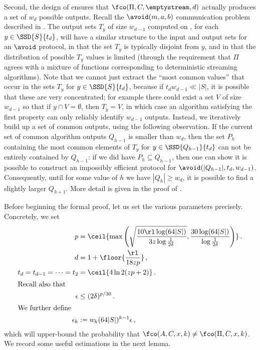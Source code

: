\begin{itemize}
\begin{itemize}
Second, the design of  ensures that
$\fco(\Pi,C,\emptystream,d)$
actually produces a set of $w_d$ possible outputs. Recall the $\avoid(m,a,b)$
communication problem described in . The output
sets $T_y$ of size $w_{d-1}$ computed on , for
each $y \in \SSD{S}{t_d}$, will have a similar structure to the input
and output sets for an $\avoid$ protocol, in that the set $T_y$ is typically
disjoint from $y$, and in that the distribution of possible $T_y$ values is
limited (through the requirement that $\Pi$ agrees with a mixture of functions
corresponding to deterministic streaming algorithms). Note that we
cannot just extract the ``most common values'' that occur in the sets $T_y$
for $y \in \SSD{S}{t_d}$, because if $t_d w_{d-1} \ll |S|$, it is
possible that these are very concentrated; for example there could exist a set
$V$ of size $w_{d-1}$ so that if $y \cap V = \emptyset$, then $T_y = V$, in
which case an algorithm satisfying the first property can only reliably
identify $w_{d-1}$ outputs. Instead, we iteratively build up a set of common
outputs, using the following observation. If the current set of common
algorithm outputs $Q_{h-1}$ is smaller than $w_d$, then the set $P_h$
containing the most common elements of $T_y$ for $y \in
\SSD{Q_{h-1}}{t_d}$ can not be entirely contained by $Q_{h-1}$: if we
did have $P_h \subseteq Q_{h-1}$, then one can show it is possible to
construct an impossibly efficient protocol for
$\avoid(|Q_{h-1}|,t_d,w_{d-1})$. Consequently, until for some value of $h$ we
have $|Q_{h}| \ge w_d$, it is possible to find a slightly larger $Q_{h+1}$.
More detail is given in the proof of .

\medskip Before beginning the formal proof, let us set the various parameters
precisely. Concretely, we set
\begin{align}
  p &= \ceil{\max\left(\sqrt{\frac{10 \rl \log (64|S|)}{3 z \log \frac{1}{2\delta}}}, 
    \frac{30 \log(64|S|)}{\log \frac{1}{2\delta}}\right) } \,.  \label{eq:pd-p-choice} \\
  d &= 1 + \floor{\frac{\rl}{18 zp}} \,, \label{eq:d-def} \\
  t_d = t_{d-1} = \cdots = t_2 &= \ceil{4 \ln 2 (zp+2)} \,. \\
\intertext{Recall also that}
  \epsilon &\le (2\delta)^{p/30} \,. \\
\intertext{We further define}
  \epsilon_k &:= w_k (64 |S|)^{k-1} \epsilon \,, \label{eq:eps-k-def}
\end{align}
which will upper-bound the probability that $\fco(A, C, x, k) \ne \fco(\Pi, C, x, k)$.
%
We record some useful estimations in the next lemma.


\end{itemize}
\end{itemize}
